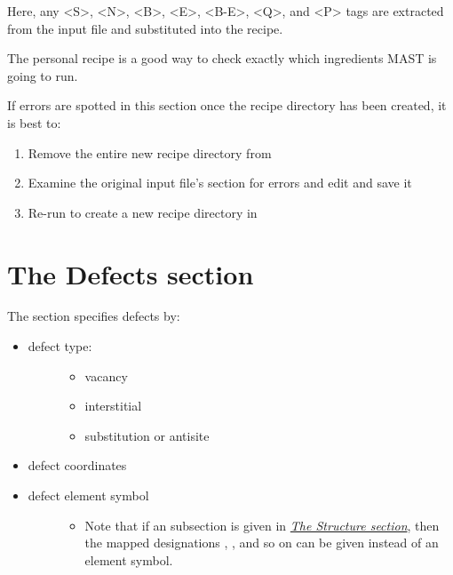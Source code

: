 \documentclass[letterpaper,10pt,english]{sphinxmanual}
\begin{document}
Here, any \textless{}S\textgreater{}, \textless{}N\textgreater{}, \textless{}B\textgreater{}, \textless{}E\textgreater{}, \textless{}B-E\textgreater{}, \textless{}Q\textgreater{}, and \textless{}P\textgreater{} tags are extracted from the input file and substituted into the recipe.

The personal recipe is a good way to check exactly which ingredients MAST is going to run.

If errors are spotted in this section once the recipe directory has been created, it is best to:
\begin{enumerate}
\item {} 
Remove the entire new recipe directory from 

\item {} 
Examine the original input file's  section for errors and edit and save it

\item {} 
Re-run  to create a new recipe directory in 

\end{enumerate}


\section{The Defects section}
\label{3_1_5_defects::doc}\label{3_1_5_defects:the-defects-section}
The  section specifies defects by:
\begin{itemize}
\item {} \begin{description}
\item[{defect type:}] \leavevmode\begin{itemize}
\item {} 
vacancy

\item {} 
interstitial

\item {} 
substitution or antisite

\end{itemize}

\end{description}

\item {} 
defect coordinates

\item {} \begin{description}
\item[{defect element symbol}] \leavevmode\begin{itemize}
\item {} 
Note that if an  subsection is given in {\hyperref[3_1_1_structure::doc]{\emph{The Structure section}}}, then the mapped designations , , and so on can be given instead of an element symbol.

\end{itemize}

\end{description}

\end{itemize}
\end{document}
